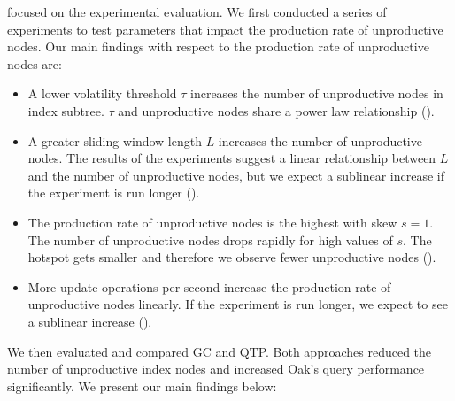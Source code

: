 \documentclass[abstracton,12pt]{scrartcl}
\theoremstyle{definition}
\begin{document}
\label{sec:summary}

 focused on the experimental evaluation.
We first conducted a series of experiments to test parameters that
impact the production rate of unproductive nodes.
Our main findings with respect to the production rate of unproductive nodes are:

\begin{itemize}

    \item A lower volatility threshold $\tau$ increases the number of 
        unproductive nodes in index subtree. $\tau$ and unproductive 
        nodes share a power law relationship ().

    \item A greater sliding window length $L$ increases the number of
        unproductive nodes. The results of the experiments suggest a
         linear relationship between $L$ and the number of unproductive
        nodes, but we expect a sublinear increase if the experiment is
        run longer ().

    \item The production rate of unproductive nodes is the highest with skew
        $s = 1$. The number of unproductive nodes drops rapidly for high
        values of $s$. The hotspot gets smaller and therefore we observe 
        fewer unproductive nodes ().

    \item More update operations per second increase the production rate of
        unproductive nodes linearly. If the experiment is run longer, we expect
        to see a sublinear increase ().

\end{itemize}

We then evaluated and compared GC and QTP. Both approaches reduced the
number of unproductive index nodes and increased Oak's query
performance significantly. We present our main findings below:
\end{document}
